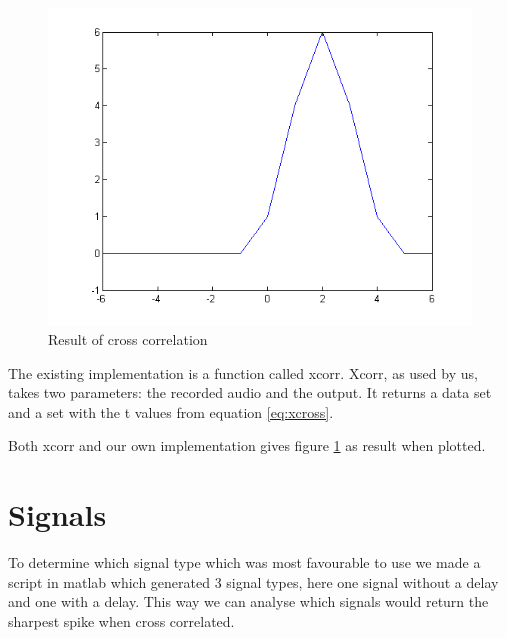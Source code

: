 \begin{figure}[H]
\centering
\includegraphics[scale=0.5]{billeder/xcorrResult.png}
\caption{Result of cross correlation}
\label{fig:xcorrResult}
\end{figure} 


The existing implementation is a function called xcorr. Xcorr, as used by us, takes two parameters: the recorded audio and the output. It returns a data set and a set with the t values from equation \ref{eq:xcross}.

Both xcorr and our own implementation gives figure \ref{fig:xcorrResult} as result when plotted.

\section{Signals}
To determine which signal type which was most favourable to use we made a script in matlab which generated 3 signal types, here one signal without a delay and one with a delay. This way we can analyse which signals would return the sharpest spike when cross correlated.
